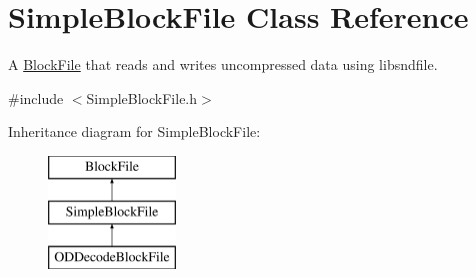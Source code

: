 \hypertarget{class_simple_block_file}{}\section{Simple\+Block\+File Class Reference}
\label{class_simple_block_file}


A \hyperlink{class_block_file}{Block\+File} that reads and writes uncompressed data using libsndfile.  




{\ttfamily \#include $<$Simple\+Block\+File.\+h$>$}

Inheritance diagram for Simple\+Block\+File\+:\begin{figure}[H]
\begin{center}
\leavevmode
\includegraphics[height=3.000000cm]{class_simple_block_file}
\end{center}
\end{figure}
